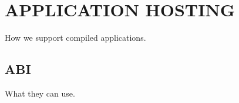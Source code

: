 \chapter{APPLICATION HOSTING}
\label{hosting}
How we support compiled applications.

\section{ABI}
\label{hosting:abi}
What they can use.

